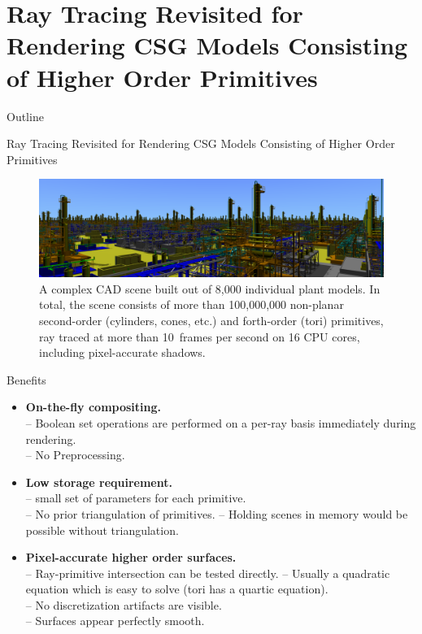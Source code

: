 \documentclass{beamer}
\begin{document}
\section{Ray Tracing Revisited for Rendering CSG Models Consisting of Higher Order Primitives}

\begin{frame}{Outline}
\end{frame}

\begin{frame}{Ray Tracing Revisited for Rendering CSG Models Consisting of Higher Order Primitives}
	\begin{figure}[ht!]
		\includegraphics[width=1.0\linewidth]{figures/Plant_Teaser.png}
		\caption{
			A complex CAD scene built out of 8,000 individual plant models. In total, the scene consists of more than 100,000,000 non-planar second-order (cylinders, cones, etc.) and forth-order (tori) primitives, ray traced at more than 10~frames per second on 16 CPU
			cores, including pixel-accurate shadows.
		}
	\end{figure}
\end{frame}

\begin{frame}{Benefits}
	\begin{itemize}
		\item \textbf{On-the-fly compositing.}\\
		-- Boolean set operations are performed on a per-ray basis immediately	during rendering.\\
		-- No Preprocessing.
		\item \textbf{Low storage requirement.}\\
		-- small set of parameters for each primitive.\\
		-- No prior triangulation of primitives.
		-- Holding scenes in memory would be possible without triangulation.
		\item \textbf{Pixel-accurate higher order surfaces.}\\
		-- Ray-primitive intersection can be tested directly.
		-- Usually a quadratic equation which is easy to solve (tori has a quartic equation).\\
		-- No discretization artifacts are visible.\\
		-- Surfaces appear perfectly smooth.\\
	\end{itemize}
\end{frame}
\end{document}
